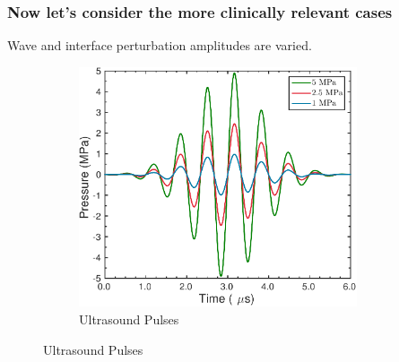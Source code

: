% 
% 
\begin{frame}
\end{frame}
% 
% 
\begin{frame}\frametitle{\vspace*{0.5cm}Now let's consider the more clinically relevant cases}
  \hspace*{0.22cm}Wave and interface perturbation amplitudes are varied.%
  \begin{figure}
    \captionsetup[subfigure]{labelformat=empty}
    \centering
    \begin{subfigure}[b]{0.5\textwidth}
      \includegraphics[width=0.9\textwidth]{./figs/us_pulse_amps_dim}
      \caption{Ultrasound Pulses}
    \end{subfigure}
    \hspace*{0.5cm}
\end{figure}
\end{frame}
